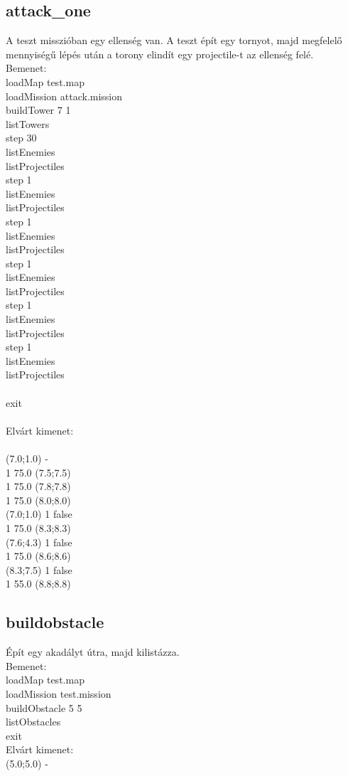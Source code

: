 \subsection{attack\_one}
A teszt misszióban egy ellenség van. A teszt épít egy tornyot, majd megfelelő mennyiségű lépés után a torony elindít egy projectile-t az ellenség felé. \\
Bemenet:\\
loadMap test.map\\
loadMission attack.mission\\
buildTower 7 1\\
listTowers\\
step 30\\
listEnemies\\
listProjectiles\\
step 1\\
listEnemies\\
listProjectiles\\
step 1\\
listEnemies\\
listProjectiles\\
step 1\\
listEnemies\\
listProjectiles\\
step 1\\
listEnemies\\
listProjectiles\\
step 1\\
listEnemies\\
listProjectiles\\
\\
exit\\
\\
Elvárt kimenet:\\\\
(7.0;1.0) -\\
1 75.0 (7.5;7.5)\\
1 75.0 (7.8;7.8)\\
1 75.0 (8.0;8.0)\\
(7.0;1.0) 1 false\\
1 75.0 (8.3;8.3)\\
(7.6;4.3) 1 false\\
1 75.0 (8.6;8.6)\\
(8.3;7.5) 1 false\\
1 55.0 (8.8;8.8)\\

\subsection{buildobstacle}
Épít egy akadályt útra, majd kilistázza.\\
Bemenet:\\
loadMap test.map\\
loadMission test.mission\\
buildObstacle 5 5\\
listObstacles\\
exit\\
Elvárt kimenet:\\
(5.0;5.0) -
